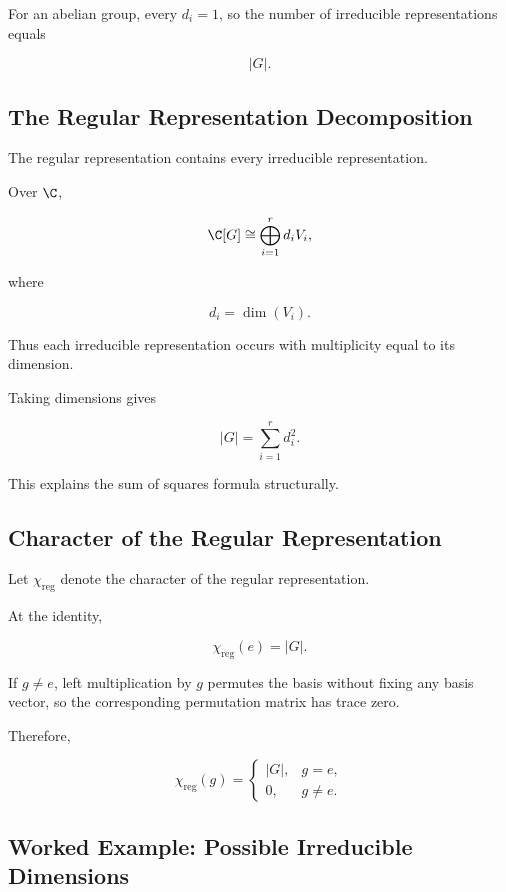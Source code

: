 For an abelian group, every \(d_i=1\), so the number of irreducible
representations equals

\[ |G|. \]

\subsection{The Regular Representation Decomposition}
\label{subsec:regular-representation-decomposition}

The regular representation contains every irreducible representation.

Over \(\C\),

\[ \C[G]\cong\bigoplus_{i=1}^{r}d_iV_i, \]

where

\[ d_i=\dim(V_i). \]

Thus each irreducible representation occurs with multiplicity equal to its
dimension.

Taking dimensions gives

\[ |G|=\sum_{i=1}^{r}d_i^2. \]

This explains the sum of squares formula structurally.

\subsection{Character of the Regular Representation}
\label{subsec:regular-character}

Let \(\chi_{\mathrm{reg}}\) denote the character of the regular
representation.

At the identity,

\[ \chi_{\mathrm{reg}}(e)=|G|. \]

If \(g\neq e\), left multiplication by \(g\) permutes the basis without
fixing any basis vector, so the corresponding permutation matrix has trace
zero.

Therefore,

\[ \boxed{
\chi_{\mathrm{reg}}(g)=
\begin{cases}
|G|,&g=e,\\
0,&g\neq e.
\end{cases}}
\]

\subsection{Worked Example: Possible Irreducible Dimensions}
\label{subsec:worked-irrep-dimensions}

